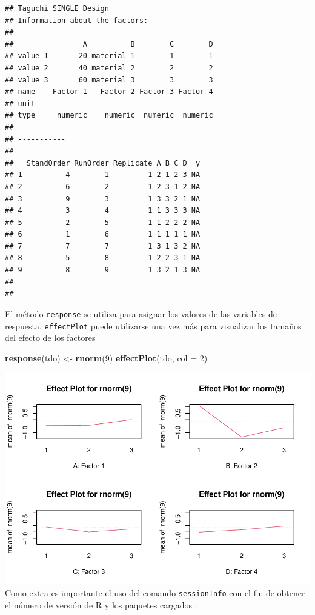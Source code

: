 \documentclass[
]{book}
\newenvironment{Shaded}{\begin{snugshade}}{\end{snugshade}}
\newcommand{\AttributeTok}[1]{\textcolor[rgb]{0.13,0.29,0.53}{#1}}
\newcommand{\DecValTok}[1]{\textcolor[rgb]{0.00,0.00,0.81}{#1}}
\newcommand{\FunctionTok}[1]{\textcolor[rgb]{0.13,0.29,0.53}{\textbf{#1}}}
\newcommand{\NormalTok}[1]{#1}
\newcommand{\OtherTok}[1]{\textcolor[rgb]{0.56,0.35,0.01}{#1}}
\begin{document}
\begin{verbatim}
## Taguchi SINGLE Design
## Information about the factors:
## 
##                A          B        C        D
## value 1       20 material 1        1        1
## value 2       40 material 2        2        2
## value 3       60 material 3        3        3
## name    Factor 1   Factor 2 Factor 3 Factor 4
## unit                                         
## type     numeric    numeric  numeric  numeric
## 
## -----------
## 
##   StandOrder RunOrder Replicate A B C D  y
## 1          4        1         1 2 1 2 3 NA
## 2          6        2         1 2 3 1 2 NA
## 3          9        3         1 3 3 2 1 NA
## 4          3        4         1 1 3 3 3 NA
## 5          2        5         1 1 2 2 2 NA
## 6          1        6         1 1 1 1 1 NA
## 7          7        7         1 3 1 3 2 NA
## 8          5        8         1 2 2 3 1 NA
## 9          8        9         1 3 2 1 3 NA
## 
## -----------
\end{verbatim}

El método \texttt{response} se utiliza para asignar los valores de las variables de respuesta. \texttt{effectPlot}
puede utilizarse una vez más para visualizar los tamaños del efecto de los factores

\begin{Shaded}
\begin{Highlighting}[]
\FunctionTok{response}\NormalTok{(tdo) }\OtherTok{\textless{}{-}} \FunctionTok{rnorm}\NormalTok{(}\DecValTok{9}\NormalTok{)}
\FunctionTok{effectPlot}\NormalTok{(tdo, }\AttributeTok{col =} \DecValTok{2}\NormalTok{)}
\end{Highlighting}
\end{Shaded}

\includegraphics{Libro_TidyQualityTools_files/figure-latex/unnamed-chunk-132-1.pdf}
Como extra es importante el uso del comando \texttt{sessionInfo} con el fin de obtener el número de versión de R y los paquetes cargados :
\end{document}
